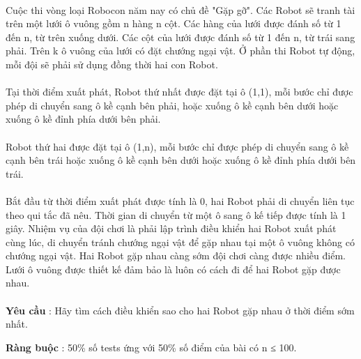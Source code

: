  

Cuộc thi vòng loại Robocon năm nay có chủ đề "Gặp gỡ". Các Robot sẽ tranh tài trên một lưới ô vuông gồm n hàng n cột. Các hàng của lưới được đánh số từ 1 đến n, từ trên xuống dưới. Các cột của lưới được đánh số từ 1 đến n, từ trái sang phải. Trên k ô vuông của lưới có đặt chướng ngại vật. Ở phần thi Robot tự động, mỗi đội sẽ phải sử dụng đồng thời hai con Robot.
\\
\\Tại thời điểm xuất phát, Robot thứ nhất được đặt tại ô (1,1), mỗi bước chỉ được phép di chuyển sang ô kề cạnh bên phải, hoặc xuống ô kề cạnh bên dưới hoặc xuống ô kề đỉnh phía dưới bên phải.
\\
\\Robot thứ hai được đặt tại ô (1,n), mỗi bước chỉ được phép di chuyển sang ô kề cạnh bên trái hoặc xuống ô kề cạnh bên dưới hoặc xuống ô kề đỉnh phía dưới bên trái.
\\
\\Bắt đầu từ thời điểm xuất phát được tính là 0, hai Robot phải di chuyển liên tục theo qui tắc đã nêu. Thời gian di chuyển từ một ô sang ô kế tiếp được tính là 1 giây. Nhiệm vụ của đội chơi là phải lập trình điều khiển hai Robot xuất phát cùng lúc, di chuyển tránh chướng ngại vật để gặp nhau tại một ô vuông không có chướng ngại vật. Hai Robot gặp nhau càng sớm đội chơi càng được nhiều điểm. Lưới ô vuông được thiết kế đảm bảo là luôn có cách đi để hai Robot gặp được nhau.
\\
\\\textbf{Yêu cầu } : Hãy tìm cách điều khiển sao cho hai Robot gặp nhau ở thời điểm sớm nhất.

\textbf{Ràng buộc } : 50\% số tests ứng với 50\% số điểm của bài có n ≤ 100.